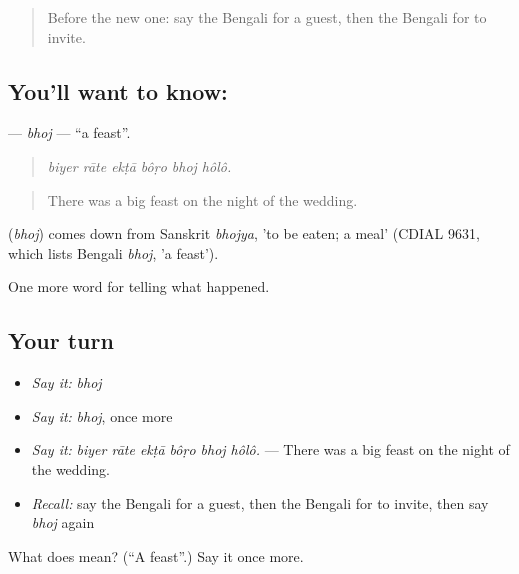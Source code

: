 \begin{quote}
Before the new one: say the Bengali for a guest, then the Bengali for to invite.
\end{quote}

\subsection*{You'll want to know: }
\textbf{} — \emph{bhoj} — \textquotedblleft{}a feast\textquotedblright{}.

\begin{quote}
     
\end{quote}

\begin{quote}
\emph{biyer rāte ekṭā bôṛo bhoj hôlô.}
\end{quote}

\begin{quote}
There was a big feast on the night of the wedding.
\end{quote}

\begin{cousinweb}
\textbf{} (\emph{bhoj}) comes down from Sanskrit \emph{bhojya}, 'to be eaten; a meal' (CDIAL 9631, which lists Bengali \emph{bhoj}, 'a feast').
\end{cousinweb}

\begin{grammarlens}[title={What you've built}]
One more word for telling what happened.
\end{grammarlens}

\subsection*{Your turn}
\begin{itemize}
\raggedright
  \item \emph{Say it:} \emph{bhoj}
  \item \emph{Say it:} \emph{bhoj}, once more
  \item \emph{Say it:} \emph{biyer rāte ekṭā bôṛo bhoj hôlô.} — There was a big feast on the night of the wedding.
  \item \emph{Recall:} say the Bengali for a guest, then the Bengali for to invite, then say \emph{bhoj} again
\end{itemize}

\begin{tcolorbox}[breakable,colback=teal!4,colframe=teal!35!black,title={Before you move on}]
What does  mean? (\textquotedblleft{}A feast\textquotedblright{}.) Say it once more.
\end{tcolorbox}
